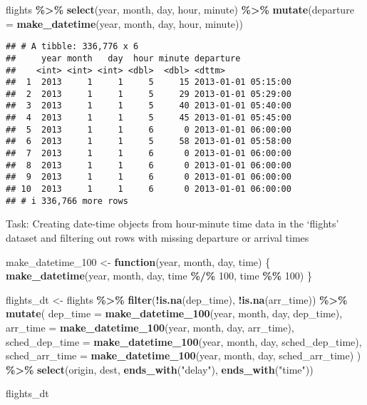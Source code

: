 \documentclass[
]{article}
\newenvironment{Shaded}{\begin{snugshade}}{\end{snugshade}}
\newcommand{\AttributeTok}[1]{\textcolor[rgb]{0.13,0.29,0.53}{#1}}
\newcommand{\ControlFlowTok}[1]{\textcolor[rgb]{0.13,0.29,0.53}{\textbf{#1}}}
\newcommand{\DecValTok}[1]{\textcolor[rgb]{0.00,0.00,0.81}{#1}}
\newcommand{\FunctionTok}[1]{\textcolor[rgb]{0.13,0.29,0.53}{\textbf{#1}}}
\newcommand{\NormalTok}[1]{#1}
\newcommand{\OtherTok}[1]{\textcolor[rgb]{0.56,0.35,0.01}{#1}}
\newcommand{\SpecialCharTok}[1]{\textcolor[rgb]{0.81,0.36,0.00}{\textbf{#1}}}
\newcommand{\StringTok}[1]{\textcolor[rgb]{0.31,0.60,0.02}{#1}}
\begin{document}
\begin{Shaded}
\begin{Highlighting}[]
\NormalTok{flights }\SpecialCharTok{\%\textgreater{}\%} 
  \FunctionTok{select}\NormalTok{(year, month, day, hour, minute) }\SpecialCharTok{\%\textgreater{}\%} 
  \FunctionTok{mutate}\NormalTok{(}\AttributeTok{departure =} \FunctionTok{make\_datetime}\NormalTok{(year, month, day, hour, minute))}
\end{Highlighting}
\end{Shaded}

\begin{verbatim}
## # A tibble: 336,776 x 6
##     year month   day  hour minute departure          
##    <int> <int> <int> <dbl>  <dbl> <dttm>             
##  1  2013     1     1     5     15 2013-01-01 05:15:00
##  2  2013     1     1     5     29 2013-01-01 05:29:00
##  3  2013     1     1     5     40 2013-01-01 05:40:00
##  4  2013     1     1     5     45 2013-01-01 05:45:00
##  5  2013     1     1     6      0 2013-01-01 06:00:00
##  6  2013     1     1     5     58 2013-01-01 05:58:00
##  7  2013     1     1     6      0 2013-01-01 06:00:00
##  8  2013     1     1     6      0 2013-01-01 06:00:00
##  9  2013     1     1     6      0 2013-01-01 06:00:00
## 10  2013     1     1     6      0 2013-01-01 06:00:00
## # i 336,766 more rows
\end{verbatim}

Task: Creating date-time objects from hour-minute time data in the
`flights' dataset and filtering out rows with missing departure or
arrival times

\begin{Shaded}
\begin{Highlighting}[]
\NormalTok{make\_datetime\_100 }\OtherTok{\textless{}{-}} \ControlFlowTok{function}\NormalTok{(year, month, day, time) \{}
  \FunctionTok{make\_datetime}\NormalTok{(year, month, day, time }\SpecialCharTok{\%/\%} \DecValTok{100}\NormalTok{, time }\SpecialCharTok{\%\%} \DecValTok{100}\NormalTok{)}
\NormalTok{\}}

\NormalTok{flights\_dt }\OtherTok{\textless{}{-}}\NormalTok{ flights }\SpecialCharTok{\%\textgreater{}\%} 
  \FunctionTok{filter}\NormalTok{(}\SpecialCharTok{!}\FunctionTok{is.na}\NormalTok{(dep\_time), }\SpecialCharTok{!}\FunctionTok{is.na}\NormalTok{(arr\_time)) }\SpecialCharTok{\%\textgreater{}\%} 
  \FunctionTok{mutate}\NormalTok{(}
    \AttributeTok{dep\_time =} \FunctionTok{make\_datetime\_100}\NormalTok{(year, month, day, dep\_time),}
    \AttributeTok{arr\_time =} \FunctionTok{make\_datetime\_100}\NormalTok{(year, month, day, arr\_time),}
    \AttributeTok{sched\_dep\_time =} \FunctionTok{make\_datetime\_100}\NormalTok{(year, month, day, sched\_dep\_time),}
    \AttributeTok{sched\_arr\_time =} \FunctionTok{make\_datetime\_100}\NormalTok{(year, month, day, sched\_arr\_time)}
\NormalTok{  ) }\SpecialCharTok{\%\textgreater{}\%} 
  \FunctionTok{select}\NormalTok{(origin, dest, }\FunctionTok{ends\_with}\NormalTok{(}\StringTok{"delay"}\NormalTok{), }\FunctionTok{ends\_with}\NormalTok{(}\StringTok{"time"}\NormalTok{))}

\NormalTok{flights\_dt}
\end{Highlighting}
\end{Shaded}
\end{document}
